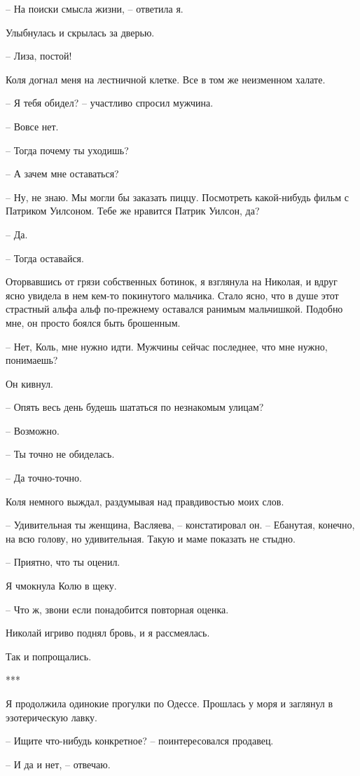 \documentclass[
]{book}
\begin{document}
-- На поиски смысла жизни, -- ответила я.

Улыбнулась и скрылась за дверью.

-- Лиза, постой!

Коля догнал меня на лестничной клетке. Все в том же неизменном халате.

-- Я тебя обидел? -- участливо спросил мужчина.

-- Вовсе нет.

-- Тогда почему ты уходишь?

-- А зачем мне оставаться?

-- Ну, не знаю. Мы могли бы заказать пиццу. Посмотреть какой-нибудь фильм с Патриком Уилсоном. Тебе же нравится Патрик Уилсон, да?

-- Да.

-- Тогда оставайся.

Оторвавшись от грязи собственных ботинок, я взглянула на Николая, и вдруг ясно увидела в нем кем-то покинутого мальчика. Стало ясно, что в душе этот страстный альфа альф по-прежнему оставался ранимым мальчишкой. Подобно мне, он просто боялся быть брошенным.

-- Нет, Коль, мне нужно идти. Мужчины сейчас последнее, что мне нужно, понимаешь?

Он кивнул.

-- Опять весь день будешь шататься по незнакомым улицам?

-- Возможно.

-- Ты точно не обиделась.

-- Да точно-точно.

Коля немного выждал, раздумывая над правдивостью моих слов.

-- Удивительная ты женщина, Васляева, -- констатировал он. -- Ебанутая, конечно, на всю голову, но удивительная. Такую и маме показать не стыдно.

-- Приятно, что ты оценил.

Я чмокнула Колю в щеку.

-- Что ж, звони если понадобится повторная оценка.

Николай игриво поднял бровь, и я рассмеялась.

Так и попрощались.

***

Я продолжила одинокие прогулки по Одессе. Прошлась у моря и заглянул в эзотерическую лавку.

-- Ищите что-нибудь конкретное? -- поинтересовался продавец.

-- И да и нет, -- отвечаю.
\end{document}
